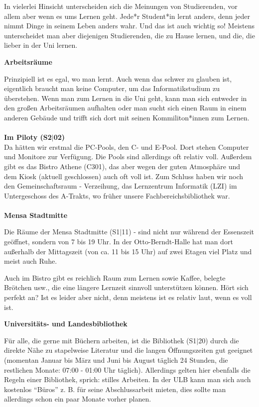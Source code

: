 {In vielerlei Hinsicht unterscheiden sich die Meinungen von Studierenden, vor allem aber wenn es ums Lernen geht. Jede*r Student*in lernt anders, denn jeder nimmt Dinge in seinem Leben anders wahr. Und das ist auch wichtig so! Meistens unterscheidet man aber diejenigen Studierenden, die zu Hause lernen, und die, die lieber in der Uni lernen.
}{
    \noindent\textbf{Arbeitsräume}

    Prinzipiell ist es egal, wo man lernt. Auch wenn das schwer zu glauben ist, eigentlich braucht man keine Computer, um das Informatikstudium zu überstehen. Wenn man zum Lernen in die Uni geht, kann man sich entweder in den großen Arbeitsräumen aufhalten oder man sucht sich einen Raum in einem anderen Gebäude und trifft sich dort mit seinen Kommiliton*innen zum Lernen.\\ \\
    \noindent\textbf{Im Piloty (S2$|$02)}\\
    Da hätten wir erstmal die PC-Pools, den C- und E-Pool. Dort stehen Computer und Monitore zur Verfügung. Die Pools sind allerdings oft relativ voll. Außerdem gibt es das Bistro Athene (C301), das aber wegen der guten Atmosphäre und dem Kiosk (aktuell geschlossen) auch oft voll ist. Zum Schluss haben wir noch den Gemeinschaftsraum - Verzeihung, das Lernzentrum Informatik (LZI) im Untergeschoss des A-Trakts, wo früher unsere Fachbereichsbibliothek war.\\ \\
    \noindent\textbf{Mensa Stadtmitte}

    Die Räume der Mensa Stadtmitte (S1$|$11) - sind nicht nur während der Essenszeit geöffnet, sondern von 7 bis 19 Uhr. In der Otto-Berndt-Halle hat man dort außerhalb der Mittagszeit (von ca. 11 bis 15 Uhr) auf zwei Etagen viel Platz und meist auch Ruhe.

    Auch im Bistro gibt es reichlich Raum zum Lernen sowie Kaffee, belegte Brötchen usw., die eine längere Lernzeit sinnvoll unterstützen können. Hört sich perfekt an? Ist es leider aber nicht, denn meistens ist es relativ laut, wenn es voll ist.\\


    \noindent\textbf{Universitäts- und Landesbibliothek}

    Für alle, die gerne mit Büchern arbeiten, ist die Bibliothek (S1$|$20) durch die direkte Nähe zu stapelweise Literatur und die langen Öffnungszeiten gut geeignet (momentan Januar bis März und Juni bis August täglich 24 Stunden, die restlichen Monate: 07:00 - 01:00 Uhr täglich). Allerdings gelten hier ebenfalls die Regeln einer Bibliothek, sprich: stilles Arbeiten. In der ULB kann man sich auch kostenlos "`Büros"' z. B. für seine Abschlussarbeit mieten, dies sollte man allerdings schon ein paar Monate vorher planen.\\

}
